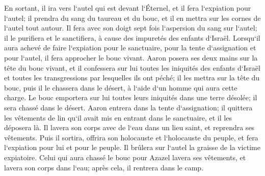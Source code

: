 \verse En sortant, il ira vers l`autel qui est devant l`Éternel, et il fera l`expiation pour l`autel; il prendra du sang du taureau et du bouc, et il en mettra sur les cornes de l`autel tout autour. 
\verse Il fera avec son doigt sept fois l`aspersion du sang sur l`autel; il le purifiera et le sanctifiera, à cause des impuretés des enfants d`Israël. 
\verse Lorsqu`il aura achevé de faire l`expiation pour le sanctuaire, pour la tente d`assignation et pour l`autel, il fera approcher le bouc vivant. 
\verse Aaron posera ses deux mains sur la tête du bouc vivant, et il confessera sur lui toutes les iniquités des enfants d`Israël et toutes les transgressions par lesquelles ils ont péché; il les mettra sur la tête du bouc, puis il le chassera dans le désert, à l`aide d`un homme qui aura cette charge. 
\verse Le bouc emportera sur lui toutes leurs iniquités dans une terre désolée; il sera chassé dans le désert. 
\verse Aaron entrera dans la tente d`assignation; il quittera les vêtements de lin qu`il avait mis en entrant dans le sanctuaire, et il les déposera là. 
\verse Il lavera son corps avec de l`eau dans un lieu saint, et reprendra ses vêtements. Puis il sortira, offrira son holocauste et l`holocauste du peuple, et fera l`expiation pour lui et pour le peuple. 
\verse Il brûlera sur l`autel la graisse de la victime expiatoire. 
\verse Celui qui aura chassé le bouc pour Azazel lavera ses vêtements, et lavera son corps dans l`eau; après cela, il rentrera dans le camp. 
